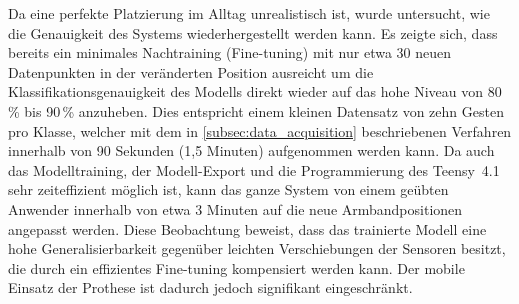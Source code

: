     Da eine perfekte Platzierung im Alltag unrealistisch ist, wurde untersucht, wie die Genauigkeit des Systems wiederhergestellt werden kann. Es zeigte sich, dass bereits ein minimales Nachtraining (Fine-tuning) mit nur etwa 30 neuen Datenpunkten in der veränderten Position ausreicht um die Klassifikationsgenauigkeit des Modells direkt wieder auf das hohe Niveau von 80\,\% bis 90\,\% anzuheben. Dies entspricht einem kleinen Datensatz von zehn Gesten pro Klasse, welcher mit dem in \autoref{subsec:data_acquisition} beschriebenen Verfahren innerhalb von 90 Sekunden (1,5 Minuten) aufgenommen werden kann. Da auch das Modelltraining, der Modell-Export und die Programmierung des \textsf{Teensy~4.1} sehr zeiteffizient möglich ist, kann das ganze System von einem geübten Anwender innerhalb von etwa 3 Minuten auf die neue Armbandpositionen angepasst werden. Diese Beobachtung beweist, dass das trainierte Modell eine hohe Generalisierbarkeit gegenüber leichten Verschiebungen der Sensoren besitzt, die durch ein effizientes Fine-tuning kompensiert werden kann. Der mobile Einsatz der Prothese ist dadurch jedoch signifikant eingeschränkt.
